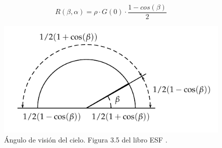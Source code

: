 \begin{itemize}
\begin{equation}
R(\beta ,\alpha)=\rho \cdot G(0)\cdot \frac{1 - cos(\beta)}{2}
\label{eq:albedo-plano-generador}
\end{equation}
\begin{figure}[htbp]
\centering
\includegraphics[scale=1.1]{figuras/AnguloVisionCielo.pdf}
\caption{\label{fig:org47d9a1c}Ángulo de visión del cielo. Figura 3.5 del libro ESF \cite{Perpinan2023}.}
\end{figure}
\end{itemize}

\FloatBarrier

